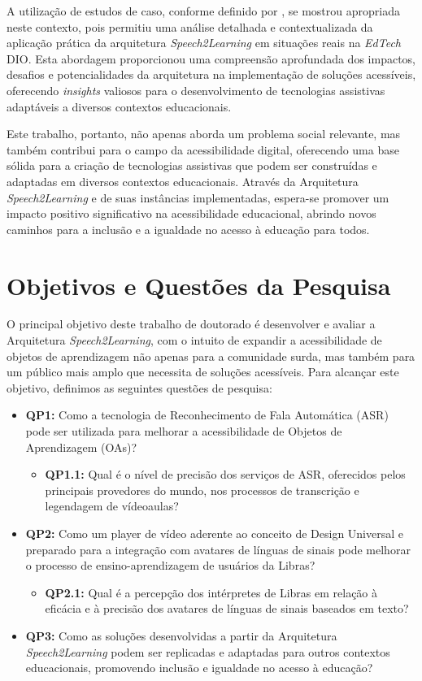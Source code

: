A utilização de estudos de caso, conforme definido por , se mostrou apropriada neste contexto, pois permitiu uma análise detalhada e contextualizada da aplicação prática da arquitetura \textit{Speech2Learning} em situações reais na \textit{EdTech} DIO. Esta abordagem proporcionou uma compreensão aprofundada dos impactos, desafios e potencialidades da arquitetura na implementação de soluções acessíveis, oferecendo \textit{insights} valiosos para o desenvolvimento de tecnologias assistivas adaptáveis a diversos contextos educacionais.

Este trabalho, portanto, não apenas aborda um problema social relevante, mas também contribui para o campo da acessibilidade digital, oferecendo uma base sólida para a criação de tecnologias assistivas que podem ser construídas e adaptadas em diversos contextos educacionais. Através da Arquitetura \textit{Speech2Learning} e de suas instâncias implementadas, espera-se promover um impacto positivo significativo na acessibilidade educacional, abrindo novos caminhos para a inclusão e a igualdade no acesso à educação para todos.

\section{Objetivos e Questões da Pesquisa}

O principal objetivo deste trabalho de doutorado é desenvolver e avaliar a Arquitetura \textit{Speech2Learning}, com o intuito de expandir a acessibilidade de objetos de aprendizagem não apenas para a comunidade surda, mas também para um público mais amplo que necessita de soluções acessíveis. Para alcançar este objetivo, definimos as seguintes questões de pesquisa:

\begin{itemize}
\item \textbf{QP1:} Como a tecnologia de Reconhecimento de Fala Automática (ASR) pode ser utilizada para melhorar a acessibilidade de Objetos de Aprendizagem (OAs)?
\begin{itemize}
\item \textbf{QP1.1:} Qual é o nível de precisão dos serviços de ASR, oferecidos pelos principais provedores do mundo, nos processos de transcrição e legendagem de vídeoaulas?
\end{itemize}
\item \textbf{QP2:} Como um player de vídeo aderente ao conceito de Design Universal e preparado para a integração com avatares de línguas de sinais pode melhorar o processo de ensino-aprendizagem de usuários da Libras?
\begin{itemize}
\item \textbf{QP2.1:} Qual é a percepção dos intérpretes de Libras em relação à eficácia e à precisão dos avatares de línguas de sinais baseados em texto?
\end{itemize}
\item \textbf{QP3:} Como as soluções desenvolvidas a partir da Arquitetura \textit{Speech2Learning} podem ser replicadas e adaptadas para outros contextos educacionais, promovendo inclusão e igualdade no acesso à educação?
\end{itemize}

